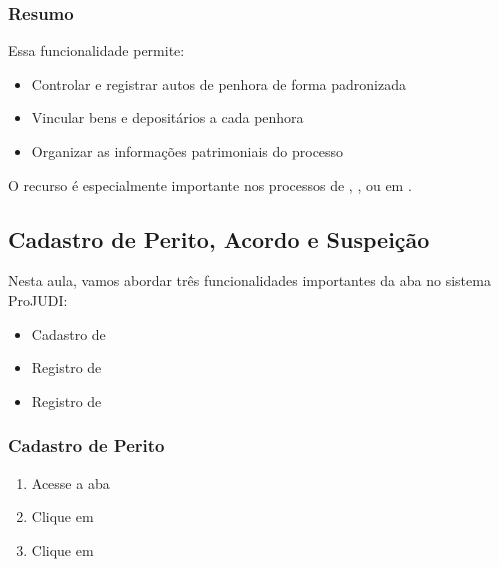 \documentclass[letterpaper,10pt,brazil]{sphinxmanual}
\begin{document}
\subsubsection{Resumo}
\label{\detokenize{projud_21_cadastrobempenhora:resumo}}
\sphinxAtStartPar
Essa funcionalidade permite:
\begin{itemize}
\item {} 
\sphinxAtStartPar
Controlar e registrar autos de penhora de forma padronizada

\item {} 
\sphinxAtStartPar
Vincular bens e depositários a cada penhora

\item {} 
\sphinxAtStartPar
Organizar as informações patrimoniais do processo

\end{itemize}

\sphinxAtStartPar
O recurso é especialmente importante nos processos de , , ou em .

\sphinxstepscope


\subsection{Cadastro de Perito, Acordo e Suspeição}
\label{\detokenize{projud_22_cadastroperiodo:cadastro-de-perito-acordo-e-suspeicao}}\label{\detokenize{projud_22_cadastroperiodo::doc}}
\sphinxAtStartPar
Nesta aula, vamos abordar três funcionalidades importantes da aba  no sistema ProJUDI:
\begin{itemize}
\item {} 
\sphinxAtStartPar
Cadastro de 

\item {} 
\sphinxAtStartPar
Registro de 

\item {} 
\sphinxAtStartPar
Registro de 

\end{itemize}


\subsubsection{Cadastro de Perito}
\label{\detokenize{projud_22_cadastroperiodo:cadastro-de-perito}}\begin{enumerate}
%
\item {} 
\sphinxAtStartPar
Acesse a aba 

\item {} 
\sphinxAtStartPar
Clique em 

\item {} 
\sphinxAtStartPar
Clique em 

\end{enumerate}
\end{document}
